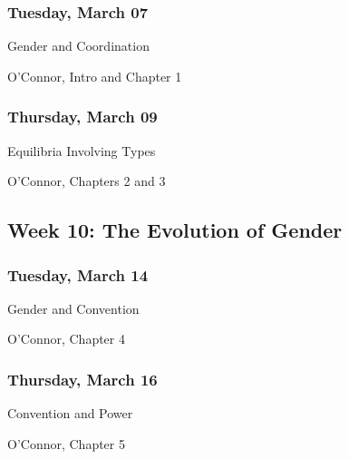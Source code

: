 \documentclass[
]{article}
\providecommand{\tightlist}{%
  \setlength{\itemsep}{0pt}\setlength{\parskip}{0pt}}
\begin{document}
\begin{multicols}{2}

\hypertarget{tuesday-march-07}{%
\subsubsection{Tuesday, March 07}\label{tuesday-march-07}}

\begin{description}
\tightlist
\item[Topic]
Gender and Coordination
\item[Reading]
O'Connor, Intro and Chapter 1
\end{description}

\hypertarget{thursday-march-09}{%
\subsubsection{Thursday, March 09}\label{thursday-march-09}}

\begin{description}
\tightlist
\item[Topic]
Equilibria Involving Types
\item[Reading]
O'Connor, Chapters 2 and 3
\end{description}

\end{multicols}

\hypertarget{week-10-the-evolution-of-gender}{%
\subsection{Week 10: The Evolution of
Gender}\label{week-10-the-evolution-of-gender}}

\begin{multicols}{2}

\hypertarget{tuesday-march-14}{%
\subsubsection{Tuesday, March 14}\label{tuesday-march-14}}

\begin{description}
\tightlist
\item[Topic]
Gender and Convention
\item[Reading]
O'Connor, Chapter 4
\end{description}

\hypertarget{thursday-march-16}{%
\subsubsection{Thursday, March 16}\label{thursday-march-16}}

\begin{description}
\tightlist
\item[Topic]
Convention and Power
\item[Reading]
O'Connor, Chapter 5
\end{description}

\end{multicols}
\end{document}
